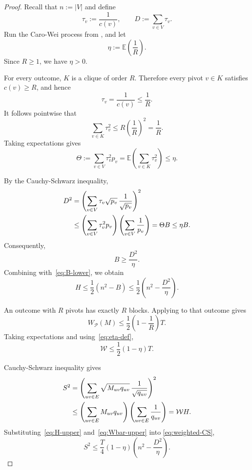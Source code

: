 \documentclass[11pt]{article}
\numberwithin{equation}{section}
\theoremstyle{definition}
\theoremstyle{remark}
\newcommand{\E}{\mathbb E}
\begin{document}
	\begin{proof}
		Recall that $n:=|V|$ and define
		\begin{equation}\label{eq:tau-D-Phi}
			\tau_v:=\frac1{c(v)},
			\qquad
			D:=\sum_{v\in V}\tau_v.
		\end{equation}
		Run the Caro-Wei process from , and let
		\begin{equation}\label{eq:eta-def}
			\eta:=\E\left(\frac1R\right).
		\end{equation}
		Since $R\geq1$, we have $\eta>0$.
		
		For every outcome, $K$ is a
		clique of order $R$.  Therefore every pivot $v\in K$ satisfies
		$c(v)\geq R$, and hence
		\[
		\tau_v=\frac1{c(v)}\leq\frac1R.
		\]
		It follows pointwise that
		\[
		\sum_{v\in K}\tau_v^2
		\leq
		R\left(\frac1R\right)^2
		=\frac1R.
		\]
		Taking expectations gives
		\begin{equation}\label{eq:Theta-bound}
			\Theta
			:=
			\sum_{v\in V}\tau_v^2p_v
			=
			\E\left(\sum_{v\in K}\tau_v^2\right)
			\leq\eta.
		\end{equation}
		
		By the Cauchy-Schwarz inequality,
		\begin{align}
			D^2
			&=
			\left(
			\sum_{v\in V}
			\tau_v\sqrt{p_v}\,\frac1{\sqrt{p_v}}
			\right)^2 \notag\\
			&\leq
			\left(\sum_{v\in V}\tau_v^2p_v\right)
			\left(\sum_{v\in V}\frac1{p_v}\right)
			=\Theta B
			\leq\eta B.
			\label{eq:D-square}
		\end{align}
		Consequently,
		\begin{equation}\label{eq:B-lower}
			B\geq\frac{D^2}{\eta}.
		\end{equation}
		Combining  with~\eqref{eq:B-lower}, we obtain
		\begin{equation}\label{eq:H-upper}
			H
			\leq
			\frac12\left(n^2-B\right)
			\leq
			\frac12\left(n^2-\frac{D^2}{\eta}\right).
		\end{equation}
		
		
		An outcome with $R$ pivots has exactly $R$ blocks.  Applying
		 to that outcome gives
		\[
		W_{\mathcal P}(M)
		\leq
		\frac12\left(1-\frac1R\right)T.
		\]
		Taking expectations and using~\eqref{eq:eta-def},
		\begin{equation}\label{eq:Wbar-upper}
			\mathcal W
			\leq
			\frac12(1-\eta)T.
		\end{equation}
		
		Cauchy-Schwarz inequality gives
		\begin{align}
			S^2
			&=
			\left(
			\sum_{uv\in E}
			\sqrt{M_{uv}q_{uv}}\,\frac1{\sqrt{q_{uv}}}
			\right)^2 \notag\\
			&\leq
			\left(\sum_{uv\in E}M_{uv}q_{uv}\right)
			\left(\sum_{uv\in E}\frac1{q_{uv}}\right)
			=\mathcal W H.
			\label{eq:weighted-CS}
		\end{align}
		Substituting~\eqref{eq:H-upper} and~\eqref{eq:Wbar-upper} into
		\eqref{eq:weighted-CS},
		\begin{equation}\label{eq:S-intermediate}
			S^2
			\leq
			\frac{T}{4}(1-\eta)
			\left(n^2-\frac{D^2}{\eta}\right).
		\end{equation}
		

\end{proof}
\end{document}
